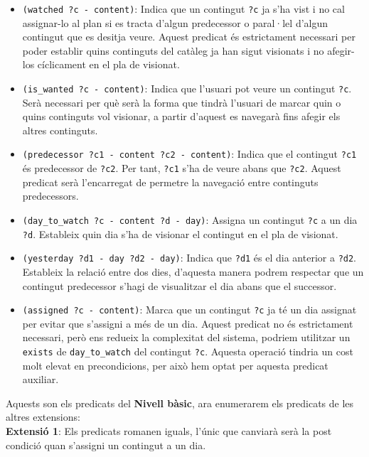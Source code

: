 \documentclass[a4paper]{article}
\begin{document}
	\begin{itemize}
		\item \texttt{(watched ?c - content)}: Indica que un contingut \texttt{?c} ja s'ha vist i no cal assignar-lo al plan si es tracta d'algun predecessor o paral·lel d'algun contingut que es desitja veure. Aquest predicat és estrictament necessari per poder establir quins continguts del catàleg ja han sigut visionats i no afegir-los cíclicament en el pla de visionat.
		\item \texttt{(is\_wanted ?c - content)}: Indica que l'usuari pot veure un contingut \texttt{?c}. Serà necessari per què serà la forma que tindrà l'usuari de marcar quin o quins continguts vol visionar, a partir d'aquest es navegarà fins afegir els altres continguts.
		\item \texttt{(predecessor ?c1 - content ?c2 - content)}: Indica que el contingut \texttt{?c1} és predecessor de \texttt{?c2}. Per tant, \texttt{?c1} s'ha de veure abans que \texttt{?c2}. Aquest predicat serà l'encarregat de permetre la navegació entre continguts predecessors.
		\item \texttt{(day\_to\_watch ?c - content ?d - day)}: Assigna un contingut \texttt{?c} a un dia \texttt{?d}. Estableix quin dia s'ha de visionar el contingut en el pla de visionat.
		\item \texttt{(yesterday ?d1 - day ?d2 - day)}: Indica que \texttt{?d1} és el dia anterior a \texttt{?d2}. Estableix la relació entre dos dies, d'aquesta manera podrem respectar que un contingut predecessor s'hagi de visualitzar el dia abans que el successor.
		\item \texttt{(assigned ?c - content)}: Marca que un contingut \texttt{?c} ja té un dia assignat per evitar que s'assigni a més de un dia. Aquest predicat no és estrictament necessari, però ens redueix la complexitat del sistema, podriem utilitzar un \texttt{exists} de \texttt{day\_to\_watch} del contingut \texttt{?c}. Aquesta operació tindria un cost molt elevat en precondicions, per això hem optat per aquesta predicat auxiliar.
	\end{itemize}
	
	\noindent Aquests son els predicats del \textbf{Nivell bàsic}, ara enumerarem els predicats de les altres extensions: \\
	
	\noindent \textbf{Extensió 1}: Els predicats romanen iguals, l'únic que canviarà serà la post condició quan s'assigni un contingut a un dia. \\
	
\end{document}
